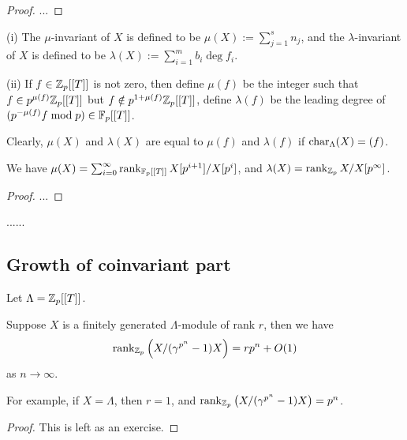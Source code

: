 \begin{proof}
...
\end{proof}

\begin{definition}
\label{iwasawa-mod-invariants}
{\rm(i)}
The $\mu$-invariant of $X$
is defined to be $\mu(X):=\sum_{j=1}^sn_j$,
and the $\lambda$-invariant of $X$
is defined to be $\lambda(X):=\sum_{i=1}^mb_i\deg f_i$.

{\rm(ii)}
If $f\in{\mathbb {Z}}_p[[T]]$ is not zero, then define
$\mu(f)$ be the integer such that
$f\in p^{\mu(f)}{\mathbb {Z}}_p[[T]]$ but
$f\notin p^{1+\mu(f)}{\mathbb {Z}}_p[[T]]$,
define $\lambda(f)$ be the leading degree of
$(p^{-\mu(f)}f\bmod p)\in{\mathbb {F}}_p[[T]]$.
\end{definition}

Clearly, $\mu(X)$ and $\lambda(X)$ are equal to
$\mu(f)$ and $\lambda(f)$ if $\operatorname{char}_\Lambda(X)=(f)$.

\begin{prop}
\label{iwasawa-mod-invariants-2}
We have $\mu(X)=\sum_{i=0}^\infty\operatorname{rank}_{{\mathbb {F}}_p[[T]]}X[p^{i+1}]/X[p^i]$,
and $\lambda(X)=\operatorname{rank}_{{\mathbb {Z}}_p}X/X[p^\infty]$.
\end{prop}

\begin{proof}
...
\end{proof}

......

\subsection{Growth of coinvariant part}

Let $\Lambda={\mathbb {Z}}_p[[T]]$.

\begin{lem}\label{p:rank-growth}
Suppose $X$ is a finitely generated $\Lambda$-module
of rank $r$,
then we have
$$
\operatorname{rank}_{{\mathbb {Z}}_p}\left(X/(\gamma^{p^n}-1)X\right)=rp^n+O(1)
$$
as $n\to\infty$.
\end{lem}

For example, if $X=\Lambda$, then $r=1$,
and $\operatorname{rank}_{{\mathbb {Z}}_p}\big(X/(\gamma^{p^n}-1)X\big)=p^n$.

\begin{proof}
This is left as an exercise.
\end{proof}

